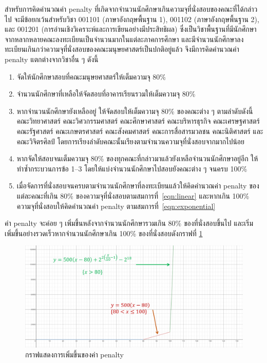 สำหรับการคิดคำนวณค่า penalty ที่เกิดจากจำนวนนักศึกษาเกินความจุที่นั่งสอบของคณะที่ได้กล่าวไป จะมีข้อยกเว้นสำหรับวิชา 001101 (ภาษาอังกฤษพื้นฐาน 1), 001102 (ภาษาอังกฤษพื้นฐาน 2), และ 001201 (การอ่านเชิงวิเคราะห์และการเขียนอย่างมีประสิทธิผล)
ซึ่งเป็นวิชาพื้นฐานที่มีนักศึกษาจากหลากหลายคณะลงทะเบียนเป็นจำนวนมากในแต่ละภาคการศึกษา และมีจำนวนนักศึกษาลงทะเบียนเกินกว่าความจุที่นั่งสอบของคณะมนุษยศาสตร์เป็นปกติอยู่แล้ว จึงมีการคิดคำนวณค่า penalty แตกต่างจากวิชาอื่น ๆ ดังนี้

\begin{enumerate}
    \item จัดให้นักศึกษาสอบที่คณะมนุษยศาสตร์ให้เต็มความจุ 80\% 
    \item จำนวนนักศึกษาที่เหลือให้จัดสอบที่อาคารเรียนรวมให้เต็มความจุ 80\% 
    \item หากจำนวนนักศึกษายังเหลืออยู่ ให้จัดสอบให้เต็มความจุ 80\% ของคณะต่าง ๆ ตามลำดับดังนี้ คณะวิทยาศาสตร์ คณะวิศวกรรมศาสตร์ คณะศึกษาศาสตร์ คณะบริหารธุรกิจ คณะเศรษฐศาสตร์ คณะรัฐศาสตร์ คณะเกษตรศาสตร์ คณะสังคมศาสตร์ คณะการสื่อสารมวลชน คณะนิติศาสตร์ และคณะวิจิตรศิลป์
    โดยการเรียงลำดับคณะนั้นเรียงตามจำนวนความจุที่นั่งสอบจากมากไปน้อย 
    \item หากจัดให้สอบจนเต็มความจุ 80\% ของทุกคณะที่กล่าวมาแล้วยังเหลือจำนวนนักศึกษาอยู่อีก ให้ทำซ้ำกระบวนการข้อ 1--3 โดยให้แบ่งจำนวนนักศึกษาไปสอบยังคณะต่าง ๆ จนครบ 100\%
    \item เมื่อจัดการที่นั่งสอบจนครบตามจำนวนนักศึกษาที่ลงทะเบียนแล้วให้คิดคำนวณค่า penalty ของแต่ละคณะที่เกิน 80\% ของความจุที่นั่งสอบตามสมการที่~\ref{eqn:linear} และหากเกิน 100\% ความจุที่นั่งสอบให้คิดคำนวณค่า penalty ตามสมการที่~\ref{eqn:exponential}
\end{enumerate}
ค่า penalty จะค่อย ๆ เพิ่มขึ้นหลังจากจำนวนนักศึกษารวมเกิน 80\% ของที่นั่งสอบขึ้นไป และเริ่มเพิ่มขึ้นอย่างรวดเร็วหากจำนวนนักศึกษาเกิน 100\% ของที่นั่งสอบดังกราฟที่ \ref{fig:penalty_graph}

\begin{figure}
    \begin{center}
      \includegraphics[width=\linewidth]{images/penalty_graph.png}
    \end{center}
    \caption[กราฟแสดงการเพิ่มขึ้นของค่า penalty]{กราฟแสดงการเพิ่มขึ้นของค่า penalty}
    \label{fig:penalty_graph}     
\end{figure}


